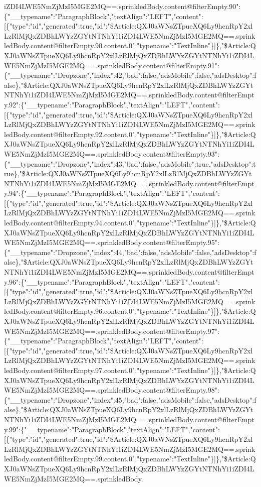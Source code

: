 iZDI4LWE5NmZjMzI5MGE2MQ==.sprinkledBody.content@filterEmpty.90":\{"\_\_typename":"ParagraphBlock","textAlign":"LEFT","content":{[}\{"type":"id","generated":true,"id":"\$Article:QXJ0aWNsZTpueXQ6Ly9hcnRpY2xlLzRlMjQxZDBhLWYzZGYtNTNhYi1iZDI4LWE5NmZjMzI5MGE2MQ==.sprinkledBody.content@filterEmpty.90.content.0","typename":"TextInline"\}{]}\},"\$Article:QXJ0aWNsZTpueXQ6Ly9hcnRpY2xlLzRlMjQxZDBhLWYzZGYtNTNhYi1iZDI4LWE5NmZjMzI5MGE2MQ==.sprinkledBody.content@filterEmpty.91":\{"\_\_typename":"Dropzone","index":42,"bad":false,"adsMobile":false,"adsDesktop":false\},"\$Article:QXJ0aWNsZTpueXQ6Ly9hcnRpY2xlLzRlMjQxZDBhLWYzZGYtNTNhYi1iZDI4LWE5NmZjMzI5MGE2MQ==.sprinkledBody.content@filterEmpty.92":\{"\_\_typename":"ParagraphBlock","textAlign":"LEFT","content":{[}\{"type":"id","generated":true,"id":"\$Article:QXJ0aWNsZTpueXQ6Ly9hcnRpY2xlLzRlMjQxZDBhLWYzZGYtNTNhYi1iZDI4LWE5NmZjMzI5MGE2MQ==.sprinkledBody.content@filterEmpty.92.content.0","typename":"TextInline"\}{]}\},"\$Article:QXJ0aWNsZTpueXQ6Ly9hcnRpY2xlLzRlMjQxZDBhLWYzZGYtNTNhYi1iZDI4LWE5NmZjMzI5MGE2MQ==.sprinkledBody.content@filterEmpty.93":\{"\_\_typename":"Dropzone","index":43,"bad":false,"adsMobile":true,"adsDesktop":true\},"\$Article:QXJ0aWNsZTpueXQ6Ly9hcnRpY2xlLzRlMjQxZDBhLWYzZGYtNTNhYi1iZDI4LWE5NmZjMzI5MGE2MQ==.sprinkledBody.content@filterEmpty.94":\{"\_\_typename":"ParagraphBlock","textAlign":"LEFT","content":{[}\{"type":"id","generated":true,"id":"\$Article:QXJ0aWNsZTpueXQ6Ly9hcnRpY2xlLzRlMjQxZDBhLWYzZGYtNTNhYi1iZDI4LWE5NmZjMzI5MGE2MQ==.sprinkledBody.content@filterEmpty.94.content.0","typename":"TextInline"\}{]}\},"\$Article:QXJ0aWNsZTpueXQ6Ly9hcnRpY2xlLzRlMjQxZDBhLWYzZGYtNTNhYi1iZDI4LWE5NmZjMzI5MGE2MQ==.sprinkledBody.content@filterEmpty.95":\{"\_\_typename":"Dropzone","index":44,"bad":false,"adsMobile":false,"adsDesktop":false\},"\$Article:QXJ0aWNsZTpueXQ6Ly9hcnRpY2xlLzRlMjQxZDBhLWYzZGYtNTNhYi1iZDI4LWE5NmZjMzI5MGE2MQ==.sprinkledBody.content@filterEmpty.96":\{"\_\_typename":"ParagraphBlock","textAlign":"LEFT","content":{[}\{"type":"id","generated":true,"id":"\$Article:QXJ0aWNsZTpueXQ6Ly9hcnRpY2xlLzRlMjQxZDBhLWYzZGYtNTNhYi1iZDI4LWE5NmZjMzI5MGE2MQ==.sprinkledBody.content@filterEmpty.96.content.0","typename":"TextInline"\}{]}\},"\$Article:QXJ0aWNsZTpueXQ6Ly9hcnRpY2xlLzRlMjQxZDBhLWYzZGYtNTNhYi1iZDI4LWE5NmZjMzI5MGE2MQ==.sprinkledBody.content@filterEmpty.97":\{"\_\_typename":"ParagraphBlock","textAlign":"LEFT","content":{[}\{"type":"id","generated":true,"id":"\$Article:QXJ0aWNsZTpueXQ6Ly9hcnRpY2xlLzRlMjQxZDBhLWYzZGYtNTNhYi1iZDI4LWE5NmZjMzI5MGE2MQ==.sprinkledBody.content@filterEmpty.97.content.0","typename":"TextInline"\}{]}\},"\$Article:QXJ0aWNsZTpueXQ6Ly9hcnRpY2xlLzRlMjQxZDBhLWYzZGYtNTNhYi1iZDI4LWE5NmZjMzI5MGE2MQ==.sprinkledBody.content@filterEmpty.98":\{"\_\_typename":"Dropzone","index":45,"bad":false,"adsMobile":false,"adsDesktop":false\},"\$Article:QXJ0aWNsZTpueXQ6Ly9hcnRpY2xlLzRlMjQxZDBhLWYzZGYtNTNhYi1iZDI4LWE5NmZjMzI5MGE2MQ==.sprinkledBody.content@filterEmpty.99":\{"\_\_typename":"ParagraphBlock","textAlign":"LEFT","content":{[}\{"type":"id","generated":true,"id":"\$Article:QXJ0aWNsZTpueXQ6Ly9hcnRpY2xlLzRlMjQxZDBhLWYzZGYtNTNhYi1iZDI4LWE5NmZjMzI5MGE2MQ==.sprinkledBody.content@filterEmpty.99.content.0","typename":"TextInline"\}{]}\},"\$Article:QXJ0aWNsZTpueXQ6Ly9hcnRpY2xlLzRlMjQxZDBhLWYzZGYtNTNhYi1iZDI4LWE5NmZjMzI5MGE2MQ==.sprinkledBody.